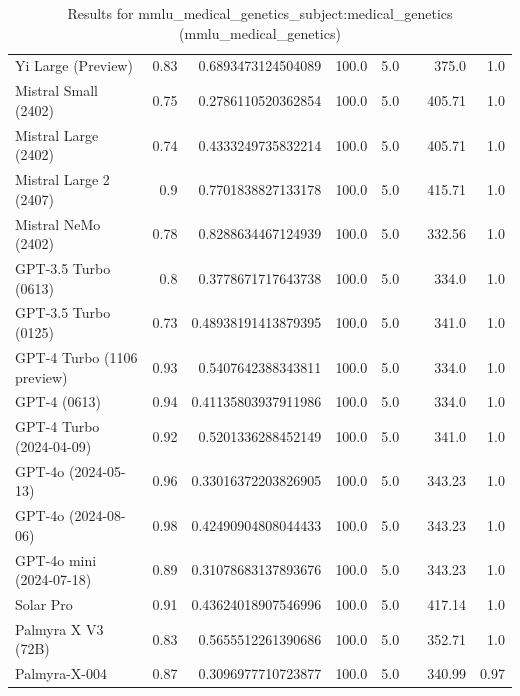 \begin{table}[htp]
{\begin{tabular}{lrrrrrrr}
Yi Large (Preview) & 0.83 & 0.6893473124504089 & 100.0 & 5.0 &  & 375.0 & 1.0 \\
Mistral Small (2402) & 0.75 & 0.2786110520362854 & 100.0 & 5.0 &  & 405.71 & 1.0 \\
Mistral Large (2402) & 0.74 & 0.4333249735832214 & 100.0 & 5.0 &  & 405.71 & 1.0 \\
Mistral Large 2 (2407) & 0.9 & 0.7701838827133178 & 100.0 & 5.0 &  & 415.71 & 1.0 \\
Mistral NeMo (2402) & 0.78 & 0.8288634467124939 & 100.0 & 5.0 &  & 332.56 & 1.0 \\
GPT-3.5 Turbo (0613) & 0.8 & 0.3778671717643738 & 100.0 & 5.0 &  & 334.0 & 1.0 \\
GPT-3.5 Turbo (0125) & 0.73 & 0.48938191413879395 & 100.0 & 5.0 &  & 341.0 & 1.0 \\
GPT-4 Turbo (1106 preview) & 0.93 & 0.5407642388343811 & 100.0 & 5.0 &  & 334.0 & 1.0 \\
GPT-4 (0613) & 0.94 & 0.41135803937911986 & 100.0 & 5.0 &  & 334.0 & 1.0 \\
GPT-4 Turbo (2024-04-09) & 0.92 & 0.5201336288452149 & 100.0 & 5.0 &  & 341.0 & 1.0 \\
GPT-4o (2024-05-13) & 0.96 & 0.33016372203826905 & 100.0 & 5.0 &  & 343.23 & 1.0 \\
GPT-4o (2024-08-06) & 0.98 & 0.42490904808044433 & 100.0 & 5.0 &  & 343.23 & 1.0 \\
GPT-4o mini (2024-07-18) & 0.89 & 0.31078683137893676 & 100.0 & 5.0 &  & 343.23 & 1.0 \\
Solar Pro & 0.91 & 0.43624018907546996 & 100.0 & 5.0 &  & 417.14 & 1.0 \\
Palmyra X V3 (72B) & 0.83 & 0.5655512261390686 & 100.0 & 5.0 &  & 352.71 & 1.0 \\
Palmyra-X-004 & 0.87 & 0.3096977710723877 & 100.0 & 5.0 &  & 340.99 & 0.97 \\
\bottomrule
\end{tabular}}
\caption{Results for mmlu_medical_genetics_subject:medical_genetics (mmlu_medical_genetics)}
\label{fig:mmlu_medical_genetics_subject:medical_genetics (mmlu_medical_genetics)}
\end{table}
